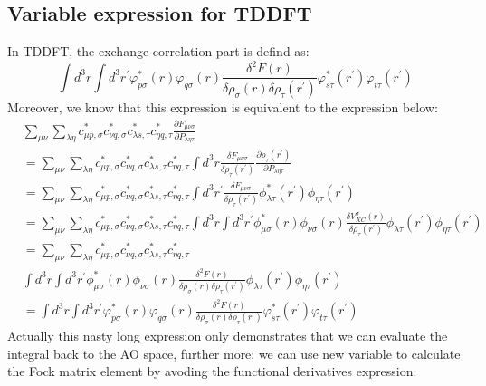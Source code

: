 \subsection{Variable expression for TDDFT}
%
%
%
%
%
In TDDFT, the exchange correlation part is defind as:
\begin{equation}
 \label{functional_derivatives_TDDFT_new_variable:1}
\int d^{3}r \int d^{3}r^{'}
\varphi_{p\sigma}^{*}(r)\varphi_{q\sigma}(r)
\frac{\delta^{2} F(r) }{\delta\rho_{\sigma}(r)
\delta\rho_{\tau}(r^{'})}
\varphi_{s\tau}^{*}(r^{'})\varphi_{t\tau}(r^{'})
\end{equation}
Moreover, we know that this expression is equivalent to the
expression below:
\begin{equation}
\label{functional_derivatives_TDDFT_new_variable:2}
\begin{split}
&\sum_{\mu\nu}\sum_{\lambda\eta}
c^{*}_{\mu p,\sigma}c^{*}_{\nu q, \sigma}
c^{*}_{\lambda s, \tau}c^{*}_ {\eta q, \tau} 
\frac{\partial F_{\mu\nu\sigma}}{\partial P_{\lambda\eta\tau}} \\
&=\sum_{\mu\nu}\sum_{\lambda\eta}
c^{*}_{\mu p,\sigma}c^{*}_{\nu q, \sigma}
c^{*}_{\lambda s, \tau}c^{*}_ {\eta q, \tau}
\int d^{3}r \frac{\delta F_{\mu\nu\sigma}}
{\delta\rho_{\tau}(r^{'})}
\frac{\partial\rho_{\tau}(r^{'})}
{\partial P_{\lambda\eta\tau}} \\ 
&=\sum_{\mu\nu}\sum_{\lambda\eta}
c^{*}_{\mu p,\sigma}c^{*}_{\nu q, \sigma}
c^{*}_{\lambda s, \tau}c^{*}_ {\eta q, \tau}
\int d^{3}r^{'} 
\frac{\delta F_{\mu\nu\sigma}}
{\delta\rho_{\tau}(r^{'})}
\phi^{*}_{\lambda\tau}(r^{'})\phi_{\eta\tau}(r^{'})
\\
&=\sum_{\mu\nu}\sum_{\lambda\eta}
c^{*}_{\mu p,\sigma}c^{*}_{\nu q, \sigma}
c^{*}_{\lambda s, \tau}c^{*}_ {\eta q, \tau}
\int d^{3}r\int d^{3}r^{'}
\phi^{*}_{\mu\sigma}(r)\phi_{\nu\sigma}(r)
\frac{\delta V^{\sigma}_{XC}(r)}{\delta\rho_{\tau}(r^{'})}
\phi_{\lambda\tau} (r^{'})\phi_{\eta\tau}(r^{'}) \\
&=\sum_{\mu\nu}\sum_{\lambda\eta}
c^{*}_{\mu p,\sigma}c^{*}_{\nu q, \sigma}
c^{*}_{\lambda s, \tau}c^{*}_ {\eta q, \tau} \\
&\int d^{3}r\int d^{3}r^{'}
\phi^{*}_{\mu\sigma}(r)\phi_{\nu\sigma}(r)
\frac{\delta^{2}
F(r)}{\delta\rho_{\sigma}(r)\delta\rho_{\tau}(r^{'})}
\phi_{\lambda\tau}(r^{'})\phi_{\eta\tau}(r^{'}) \\
&= \int d^{3}r \int d^{3}r^{'}
\varphi_{p\sigma}^{*}(r)\varphi_{q\sigma}(r)
\frac{\delta^{2} F(r) }{\delta\rho_{\sigma}(r)
\delta\rho_{\tau}(r^{'})}
\varphi_{s\tau}^{*}(r^{'})\varphi_{t\tau}(r^{'})
\end{split}
\end{equation} 
Actually this nasty long expression only demonstrates that we can
evaluate the integral back to the AO space, further more; we can use
new variable to calculate the Fock matrix element by avoding the
functional derivatives expression.

